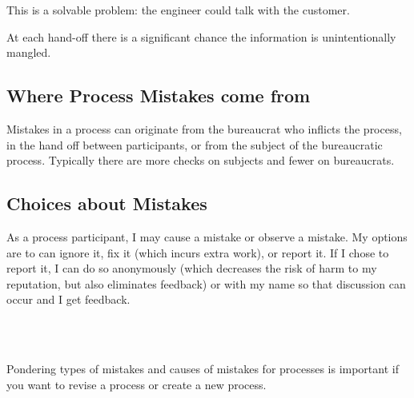 This is a solvable problem: the engineer could talk with the customer. 

At each hand-off there is a significant chance the information is unintentionally mangled. 

\subsection*{Where Process Mistakes come from}
Mistakes in a process can originate from the bureaucrat who inflicts the process, in the hand off between participants, or from the \gls{subject} of the bureaucratic process. Typically there are more checks on subjects and fewer on bureaucrats. 

\subsection*{Choices about Mistakes}
As a process participant, I may cause a mistake or observe a mistake. My options are to can ignore it, fix it (which incurs extra work), or report it. If I chose to report it, I can do so anonymously (which decreases the risk of harm to my reputation, but also eliminates feedback) or with my name so that discussion can occur and I get feedback.

\ \\

\noindent\hrulefill

\ \\

Pondering types of mistakes and causes of mistakes for processes is important if you want to revise a process or create a new process.